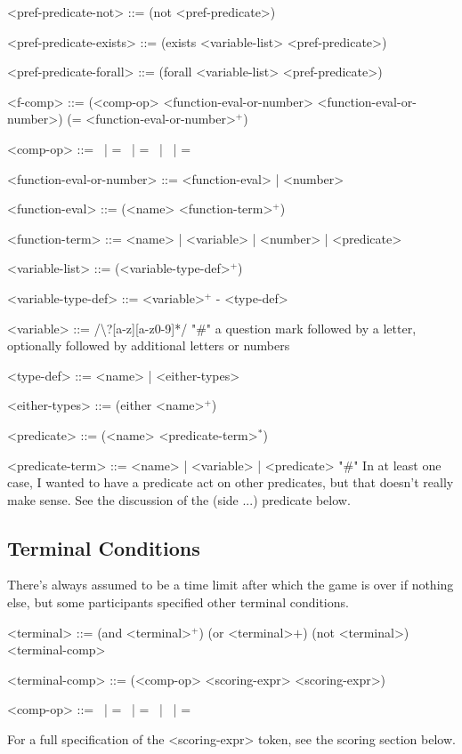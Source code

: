 \documentclass{article}
\begin{document}
\begin{grammar}
<pref-predicate-not> ::= (not <pref-predicate>)

<pref-predicate-exists> ::= (exists <variable-list> <pref-predicate>)

<pref-predicate-forall> ::= (forall <variable-list> <pref-predicate>)


<f-comp> ::= (<comp-op> <function-eval-or-number> <function-eval-or-number>) \alt
    (= <function-eval-or-number>$^+$)
    
<comp-op> ::=  \textlangle \ | \textlangle = \ | = \ | \textrangle \ | \textrangle =

<function-eval-or-number> ::= <function-eval> | <number>

<function-eval> ::= (<name> <function-term>$^+$)

<function-term> ::= <name> | <variable> | <number> | <predicate>

<variable-list> ::= (<variable-type-def>$^+$)

<variable-type-def> ::= <variable>$^+$ - <type-def>

<variable> ::= /\textbackslash?[a-z][a-z0-9]*/  "#" a question mark followed by a letter, optionally followed by additional letters or numbers

<type-def> ::= <name> | <either-types>

<either-types> ::= (either <name>$^+$)

<predicate> ::= (<name> <predicate-term>$^*$)

<predicate-term> ::= <name> | <variable> | <predicate> "#" In at least one case, I wanted to have a predicate act on other predicates, but that doesn't really make sense. See the discussion of the (side ...) predicate below.


\end{grammar}



\subsection{Terminal Conditions}
There's always assumed to be a time limit after which the game is over if nothing else, but some participants specified other terminal conditions.
        
\begin{grammar}
<terminal> ::= (and <terminal>$^+$) \alt
        (or <terminal>$+$) \alt
        (not <terminal>) \alt
        <terminal-comp>

<terminal-comp> ::= (<comp-op> <scoring-expr> <scoring-expr>) 
    
    <comp-op> ::=  \textlangle \ | \textlangle = \ | = \ | \textrangle \ | \textrangle =



\end{grammar}
For a full specification of the <scoring-expr> token, see the scoring section below.
        
\end{document}
